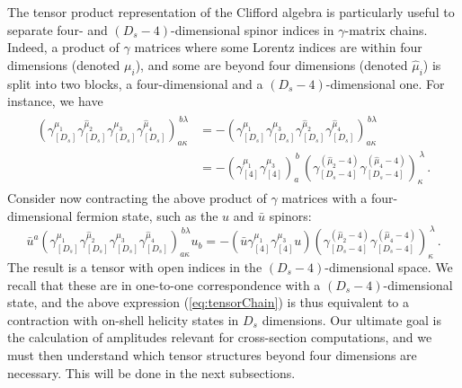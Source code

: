 The tensor product representation of the Clifford algebra is
particularly useful to separate four- and 
$(D_s-4)$-dimensional spinor indices in $\gamma$-matrix chains. 
Indeed, a product of
$\gamma$ matrices where some
Lorentz indices are within four dimensions (denoted
$\mu_i$),
and some are beyond four dimensions (denoted $\hat\mu_i$) is
split into two blocks, a four-dimensional and a 
$(D_s-4)$-dimensional one. For instance, we have
%
\begin{align}\begin{split}
    \left(\gamma_{[D_s]}^{\mu_1}
    \gamma_{[D_s]}^{\hat \mu_2}
    \gamma_{[D_s]}^{\mu_3}
    \gamma_{[D_s]}^{\hat\mu_4}\right)_{a\kappa}^{\,b\lambda} &=
%
    -\left(
    \gamma_{[D_s]}^{\mu_1}
    \gamma_{[D_s]}^{\mu_3}
    \gamma_{[D_s]}^{\hat \mu_2}
    \gamma_{[D_s]}^{\hat\mu_4} \right)_{a\kappa}^{\,b\lambda} \\
%
    &=-\left( 
    \gamma_{[4]}^{\mu_1}
    \gamma_{[4]}^{\mu_3}
    \right)_a^{\,b}   \,\left(
    \gamma_{[D_s-4]}^{(\hat \mu_2-4)}
    \gamma_{[D_s-4]}^{(\hat \mu_4-4)}
    \right)_\kappa^{\,\lambda}  \,.
  \end{split}
\end{align}
Consider now contracting the above
product of $\gamma$ matrices with a four-dimensional fermion state,
such as the $u$ and $\bar u$ spinors:
\begin{equation}
	\label{eq:tensorChain}
	\bar u^a
	\left(\gamma_{[D_s]}^{\mu_1}
	\gamma_{[D_s]}^{\hat \mu_2}
	\gamma_{[D_s]}^{\mu_3}
	\gamma_{[D_s]}^{\hat\mu_4}\right)_{a\kappa}^{\,b\lambda}
	u_b=
	-\left(\bar u
	\gamma_{[4]}^{\mu_1}
	\gamma_{[4]}^{\mu_3}
	u\right)
	\left(
	\gamma_{[D_s-4]}^{(\hat \mu_2-4)}
	\gamma_{[D_s-4]}^{(\hat \mu_4-4)}
	\right)_\kappa^{\,\lambda}\,.
\end{equation}
The result is a tensor with open indices in the
$(D_s-4)$-dimensional space.
We recall that these are in one-to-one
correspondence with a $(D_s-4)$-dimensional state, and the above expression (\ref{eq:tensorChain}) is
thus equivalent to a contraction with on-shell helicity states in $D_s$ dimensions.
%
Our ultimate goal is the calculation of amplitudes relevant for 
cross-section computations, and we must then understand which
tensor structures beyond four dimensions are necessary. 
This will be done in the next subsections.


